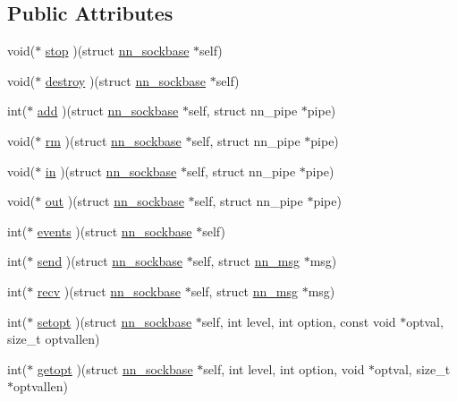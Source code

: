 \subsection*{Public Attributes}
\begin{DoxyCompactItemize}
\item 
void($\ast$ \hyperlink{structnn__sockbase__vfptr_a87d584787fda9a1e73bce636a9b0e3dc}{stop} )(struct \hyperlink{structnn__sockbase}{nn\+\_\+sockbase} $\ast$self)
\item 
void($\ast$ \hyperlink{structnn__sockbase__vfptr_a034461ee8795802694e82d917c2f7600}{destroy} )(struct \hyperlink{structnn__sockbase}{nn\+\_\+sockbase} $\ast$self)
\item 
int($\ast$ \hyperlink{structnn__sockbase__vfptr_aa9a9206a0c9227cd3f4c1852d924b761}{add} )(struct \hyperlink{structnn__sockbase}{nn\+\_\+sockbase} $\ast$self, struct nn\+\_\+pipe $\ast$pipe)
\item 
void($\ast$ \hyperlink{structnn__sockbase__vfptr_a87bbdf36e121f7b43fd33469136f4120}{rm} )(struct \hyperlink{structnn__sockbase}{nn\+\_\+sockbase} $\ast$self, struct nn\+\_\+pipe $\ast$pipe)
\item 
void($\ast$ \hyperlink{structnn__sockbase__vfptr_a7c415a0569349edaa9a871b6cf046981}{in} )(struct \hyperlink{structnn__sockbase}{nn\+\_\+sockbase} $\ast$self, struct nn\+\_\+pipe $\ast$pipe)
\item 
void($\ast$ \hyperlink{structnn__sockbase__vfptr_a00462453b9943c58957d72dc1c81993e}{out} )(struct \hyperlink{structnn__sockbase}{nn\+\_\+sockbase} $\ast$self, struct nn\+\_\+pipe $\ast$pipe)
\item 
int($\ast$ \hyperlink{structnn__sockbase__vfptr_a6423947b5789f6a86daf300fc553fec0}{events} )(struct \hyperlink{structnn__sockbase}{nn\+\_\+sockbase} $\ast$self)
\item 
int($\ast$ \hyperlink{structnn__sockbase__vfptr_aec14503d16acd7d2da2a6b4e510c0e4d}{send} )(struct \hyperlink{structnn__sockbase}{nn\+\_\+sockbase} $\ast$self, struct \hyperlink{structnn__msg}{nn\+\_\+msg} $\ast$msg)
\item 
int($\ast$ \hyperlink{structnn__sockbase__vfptr_aa62b42312d6a67f46d14be1091bc7b6e}{recv} )(struct \hyperlink{structnn__sockbase}{nn\+\_\+sockbase} $\ast$self, struct \hyperlink{structnn__msg}{nn\+\_\+msg} $\ast$msg)
\item 
int($\ast$ \hyperlink{structnn__sockbase__vfptr_a910ea7f4cb9f53ceb74ccf56d91ec3df}{setopt} )(struct \hyperlink{structnn__sockbase}{nn\+\_\+sockbase} $\ast$self, int level, int option, const void $\ast$optval, size\+\_\+t optvallen)
\item 
int($\ast$ \hyperlink{structnn__sockbase__vfptr_a0251c54dcd65d0c0524cbd0a7068d7f9}{getopt} )(struct \hyperlink{structnn__sockbase}{nn\+\_\+sockbase} $\ast$self, int level, int option, void $\ast$optval, size\+\_\+t $\ast$optvallen)
\end{DoxyCompactItemize}


